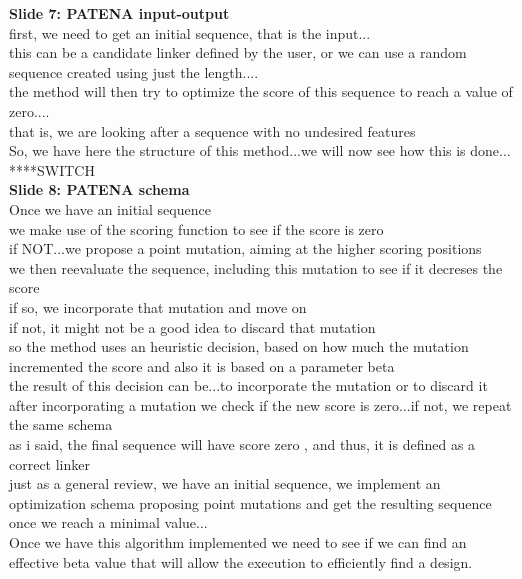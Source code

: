 \documentclass[a4paper,10pt]{article}
\begin{document}
\textbf{Slide 7: PATENA input-output}\\
first, we need to get an initial sequence, that is the input... \\
this can be a candidate linker defined by the user, or we can use a random sequence created using just the length....\\
the method will then try to optimize the score of this sequence to reach a value of zero....\\
that is, we are looking after a sequence with no undesired features\\
So, we have here the structure of this method...we will now see how this is done... ****SWITCH\\


\textbf{Slide 8: PATENA schema}\\
Once we have an initial sequence\\
we make use of the scoring function to see if the score is zero\\
if NOT...we propose a point mutation, aiming at the higher scoring positions\\
we then reevaluate the sequence, including this mutation to see if it decreses the score\\
if so, we incorporate that mutation and move on\\
if not, it might not be a good idea to discard that mutation\\
so the method uses an heuristic decision, based on how much the mutation incremented the score and also it is based on a parameter beta\\
the result of this decision can be...to incorporate the mutation or to discard it\\
after incorporating a mutation we check if the new score is zero...if not, we repeat the same schema\\
as i said, the final sequence will have score zero , and thus, it is defined as a correct linker\\
just as a general review, we have an initial sequence, we implement an optimization schema proposing point mutations and get the resulting sequence once we reach a minimal value...\\
Once we have this algorithm implemented we need to see if we can find an effective beta value that will allow the execution to efficiently find a design.\\
\end{document}

